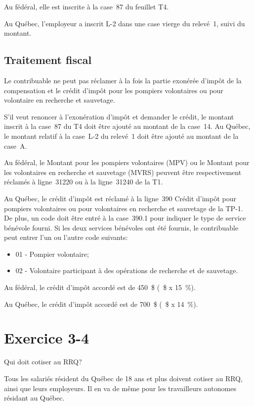 Au fédéral, elle est inscrite à la case~87 du feuillet T4. 

Au Québec, l'employeur a inscrit \og L-2 \fg{} dans une case vierge du relevé~1, suivi du montant.


\subsection{Traitement fiscal}
Le contribuable ne peut pas réclamer à la fois la partie exonérée d'impôt de la compensation et le crédit d'impôt pour les pompiers volontaires ou pour volontaire en recherche et sauvetage. 

S'il veut renoncer à l'exonération d'impôt et demander le crédit, le montant inscrit à la case~87 du T4 doit être ajouté au montant de la case~14. Au Québec, le montant relatif à la case~\og L-2 \fg{} du relevé~1 doit être ajouté au montant de la case~A.

Au fédéral, le Montant pour les pompiers volontaires (MPV) ou le Montant pour les volontaires en recherche et sauvetage (MVRS) peuvent être respectivement réclamés à ligne~31220 ou à la ligne~31240 de la T1. 

Au Québec, le crédit d'impôt est réclamé à la ligne~390 \og Crédit d'impôt pour pompiers volontaires ou pour volontaires en recherche et sauvetage \fg{} de la TP-1. De plus, un code doit être entré à la case~390.1 pour indiquer le type de service bénévole fourni. Si les deux services bénévoles ont été fournis, le contribuable peut entrer l'un ou l'autre code suivants:
\begin{itemize}
	\item 01 - Pompier volontaire; 
	\item 02 - Volontaire participant à des opérations de recherche et de sauvetage.
\end{itemize}

Au fédéral, le crédit d'impôt accordé est de 450~\$ (~\$ x 15~\%).

Au Québec, le crédit d'impôt accordé est de 700~\$ (~\$ x 14~\%).




\section{Exercice 3-4}
\setcounter{question}{0}
\begin{question}
	Qui doit cotiser au RRQ?
\end{question}
Tous les salariés résident du Québec de 18 ans et plus doivent cotiser au RRQ, ainsi que leurs employeurs. Il en va de même pour les travailleurs autonomes résidant au Québec.


